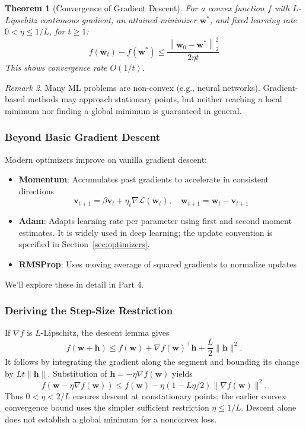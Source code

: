 \documentclass[11pt,twoside]{article}
\numberwithin{equation}{section}
\newcommand{\vect}[1]{\bm{#1}}
\newcommand{\norm}[1]{\left\lVert#1\right\rVert}
\newcommand{\Loss}{\mathcal{L}}
\theoremstyle{plain}
\newtheorem{theorem}{Theorem}[section]
\theoremstyle{definition}
\theoremstyle{remark}
\newtheorem{remark}[theorem]{Remark}
\begin{document}
\begin{theorem}[Convergence of Gradient Descent]
For a convex function $f$ with $L$-Lipschitz continuous gradient, an attained minimizer $\vect{w}^*$, and fixed learning rate $0<\eta\leq 1/L$, for $t\geq1$:
\[
f(\vect{w}_t) - f(\vect{w}^*) \leq \frac{\norm{\vect{w}_0 - \vect{w}^*}_2^2}{2\eta t}
\]
This shows convergence rate $O(1/t)$.
\end{theorem}

\begin{remark}
Many ML problems are non-convex (e.g., neural networks). Gradient-based methods may approach stationary points, but neither reaching a local minimum nor finding a global minimum is guaranteed in general.
\end{remark}

\subsubsection{Beyond Basic Gradient Descent}

Modern optimizers improve on vanilla gradient descent:

\begin{itemize}
\item \textbf{Momentum}: Accumulates past gradients to accelerate in consistent directions
\[
\vect{v}_{t+1} = \beta \vect{v}_t + \eta_t \nabla \Loss(\vect{w}_t), \quad \vect{w}_{t+1} = \vect{w}_t - \vect{v}_{t+1}
\]

\item \textbf{Adam}: Adapts learning rate per parameter using first and second moment estimates. It is widely used in deep learning; the update convention is specified in Section~\ref{sec:optimizers}.

\item \textbf{RMSProp}: Uses moving average of squared gradients to normalize updates
\end{itemize}

We'll explore these in detail in Part 4.

\subsubsection{Deriving the Step-Size Restriction}
If $\nabla f$ is $L$-Lipschitz, the descent lemma gives
\[
f(\vect w+\vect h)\le f(\vect w)+\nabla f(\vect w)^\top\vect h+\frac L2\|\vect h\|^2.
\]
It follows by integrating the gradient along the segment and bounding its change by $Lt\|\vect h\|$. Substitution of $\vect h=-\eta\nabla f(\vect w)$ yields
\[
f(\vect w-\eta\nabla f(\vect w))\le f(\vect w)
-\eta(1-L\eta/2)\|\nabla f(\vect w)\|^2.
\]
Thus $0<\eta<2/L$ ensures descent at nonstationary points; the earlier convex convergence bound uses the simpler sufficient restriction $\eta\le1/L$. Descent alone does not establish a global minimum for a nonconvex loss.
\end{document}
